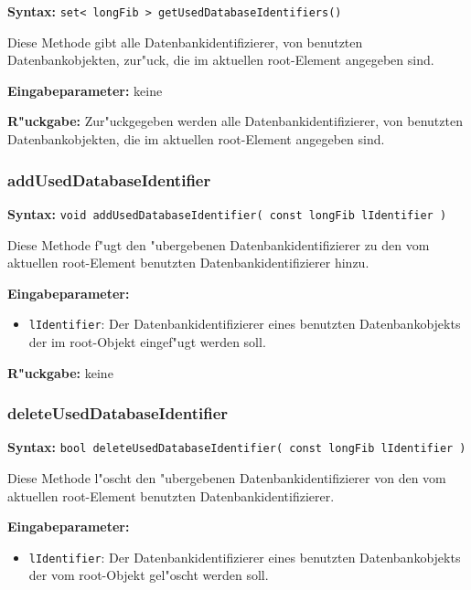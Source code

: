 \textbf{Syntax:} \verb|set< longFib > getUsedDatabaseIdentifiers()|

\bigskip\noindent
Diese Methode gibt alle Datenbankidentifizierer, von benutzten Datenbankobjekten, zur"uck, die im aktuellen root-Element angegeben sind.

\bigskip\noindent
\textbf{Eingabeparameter:} keine

\bigskip\noindent
\textbf{R"uckgabe:} Zur"uckgegeben werden alle Datenbankidentifizierer, von benutzten Datenbankobjekten, die im aktuellen root-Element angegeben sind.


\subsubsection{addUsedDatabaseIdentifier}

\textbf{Syntax:} \verb|void addUsedDatabaseIdentifier( const longFib lIdentifier )|

\bigskip\noindent
Diese Methode f"ugt den "ubergebenen Datenbankidentifizierer zu den vom aktuellen root-Element benutzten Datenbankidentifizierer hinzu.

\bigskip\noindent
\textbf{Eingabeparameter:}
\begin{itemize}
 \item \verb|lIdentifier|: Der Datenbankidentifizierer eines benutzten Datenbankobjekts der im root-Objekt eingef"ugt werden soll.
\end{itemize}

\bigskip\noindent
\textbf{R"uckgabe:} keine


\subsubsection{deleteUsedDatabaseIdentifier}

\textbf{Syntax:} \verb|bool deleteUsedDatabaseIdentifier( const longFib lIdentifier )|

\bigskip\noindent
Diese Methode l"oscht den "ubergebenen Datenbankidentifizierer von den vom aktuellen root-Element benutzten Datenbankidentifizierer.

\bigskip\noindent
\textbf{Eingabeparameter:}
\begin{itemize}
 \item \verb|lIdentifier|: Der Datenbankidentifizierer eines benutzten Datenbankobjekts der vom root-Objekt gel"oscht werden soll.
\end{itemize}

